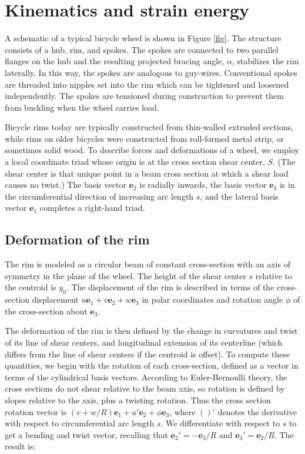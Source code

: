 \documentclass[../thesis.tex]{subfiles}
\newcommand{\et}{\mathbf{e}_2}
\newcommand{\eh}{\mathbf{e}_3}
\begin{document}
\section{Kinematics and strain energy}
A schematic of a typical bicycle wheel is shown in Figure \ref{fig}. The structure consists of a hub, rim, and spokes. The spokes are connected to two parallel flanges on the hub and the resulting projected bracing angle, $\alpha$,  stabilizes the rim laterally. In this way, the spokes are analogous to guy-wires. Conventional spokes are threaded into nipples set into the rim which can be tightened and loosened independently. The spokes are tensioned during construction to prevent them from buckling when the wheel carries load.

Bicycle rims today are typically constructed from thin-walled extruded sections, while rims on older bicycles were constructed from roll-formed metal strip, or sometimes solid wood. To describe forces and deformations of a wheel, we employ a local coordinate triad whose origin is at the cross section shear center, $S$. (The shear center is that unique point in a beam cross section at which a shear load causes no twist.) The basis vector $\mathbf{e}_2$ is radially inwards, the basis vector $\mathbf{e}_3$ is in the circumferential direction of increasing arc length $s$, and the lateral basis vector $\mathbf{e}_1$ completes a right-hand triad.

\subsection{Deformation of the rim}

The rim is modeled as a circular beam of constant cross-section with an axis of symmetry in the plane of the wheel. The height of the shear center $s$ relative to the centroid is $y_0$. The displacement of the rim is described in terms of the cross-section displacement $u\mathbf{e}_1 + v\mathbf{e}_2 + w\mathbf{e}_3$ in polar coordinates and rotation angle $\phi$ of the cross-section about $\mathbf{e}_3$.

The deformation of the rim is then defined by the change in curvatures and twist of its line of shear centers, and longitudinal extension of its centerline (which differs from the line of shear centers if the centroid is offset). To compute these quantities, we begin with the rotation of each cross-section, defined as a vector in terms of the cylindrical basis vectors. According to Euler-Bernoulli theory, the cross sections do not shear relative to the beam axis, so rotation is defined by slopes relative to the axis, plus a twisting rotation. Thus the cross section rotation vector is $(v + w/R) \mathbf{e}_1 + u' \mathbf{e}_2 + \phi\mathbf{e}_3$, where $()'$ denotes the derivative with respect to circumferential arc length $s$. We differentiate with respect to $s$ to get a bending and twist vector, recalling that $\et' = -\eh/R$ and $\eh' = \et/R$. The result is:
\end{document}
